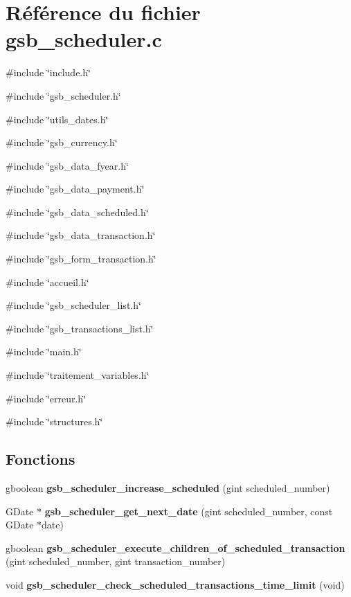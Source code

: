 \section{Référence du fichier gsb\_\-scheduler.c}
\label{gsb__scheduler_8c}
{\ttfamily \#include \char`\"{}include.h\char`\"{}}\par
{\ttfamily \#include \char`\"{}gsb\_\-scheduler.h\char`\"{}}\par
{\ttfamily \#include \char`\"{}utils\_\-dates.h\char`\"{}}\par
{\ttfamily \#include \char`\"{}gsb\_\-currency.h\char`\"{}}\par
{\ttfamily \#include \char`\"{}gsb\_\-data\_\-fyear.h\char`\"{}}\par
{\ttfamily \#include \char`\"{}gsb\_\-data\_\-payment.h\char`\"{}}\par
{\ttfamily \#include \char`\"{}gsb\_\-data\_\-scheduled.h\char`\"{}}\par
{\ttfamily \#include \char`\"{}gsb\_\-data\_\-transaction.h\char`\"{}}\par
{\ttfamily \#include \char`\"{}gsb\_\-form\_\-transaction.h\char`\"{}}\par
{\ttfamily \#include \char`\"{}accueil.h\char`\"{}}\par
{\ttfamily \#include \char`\"{}gsb\_\-scheduler\_\-list.h\char`\"{}}\par
{\ttfamily \#include \char`\"{}gsb\_\-transactions\_\-list.h\char`\"{}}\par
{\ttfamily \#include \char`\"{}main.h\char`\"{}}\par
{\ttfamily \#include \char`\"{}traitement\_\-variables.h\char`\"{}}\par
{\ttfamily \#include \char`\"{}erreur.h\char`\"{}}\par
{\ttfamily \#include \char`\"{}structures.h\char`\"{}}\par
\subsection*{Fonctions}
\begin{DoxyCompactItemize}
\item 
gboolean {\bf gsb\_\-scheduler\_\-increase\_\-scheduled} (gint scheduled\_\-number)
\item 
GDate $\ast$ {\bf gsb\_\-scheduler\_\-get\_\-next\_\-date} (gint scheduled\_\-number, const GDate $\ast$date)
\item 
gboolean {\bf gsb\_\-scheduler\_\-execute\_\-children\_\-of\_\-scheduled\_\-transaction} (gint scheduled\_\-number, gint transaction\_\-number)
\item 
void {\bf gsb\_\-scheduler\_\-check\_\-scheduled\_\-transactions\_\-time\_\-limit} (void)
\end{DoxyCompactItemize}
